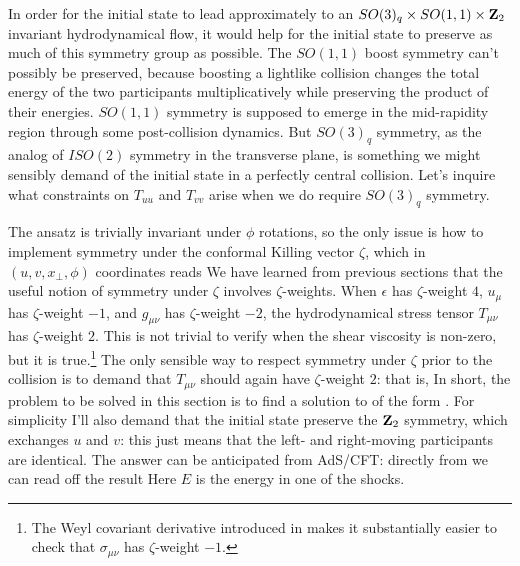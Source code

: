 \documentclass[12pt]{article}
\begin{document}
In order for the initial state  to lead approximately to an $SO(3)_q \times SO(1,1) \times {\bf Z}_2$ invariant hydrodynamical flow, it would help for the initial state to preserve as much of this symmetry group as possible.  The $SO(1,1)$ boost symmetry can't possibly be preserved, because boosting a lightlike collision changes the total energy of the two participants multiplicatively while preserving the product of their energies.  $SO(1,1)$ symmetry is supposed to emerge in the mid-rapidity region through some post-collision dynamics.  But $SO(3)_q$ symmetry, as the analog of $ISO(2)$ symmetry in the transverse plane, is something we might sensibly demand of the initial state in a perfectly central collision.  Let's inquire what constraints on $T_{uu}$ and $T_{vv}$ arise when we do require $SO(3)_q$ symmetry.

The ansatz  is trivially invariant under $\phi$ rotations, so the only issue is how to implement symmetry under the conformal Killing vector $\zeta$, which in $(u,v,x_\perp,\phi)$ coordinates reads
We have learned from previous sections that the useful notion of symmetry under $\zeta$ involves $\zeta$-weights.  When $\epsilon$ has $\zeta$-weight $4$, $u_\mu$ has $\zeta$-weight $-1$, and $g_{\mu\nu}$ has $\zeta$-weight $-2$, the hydrodynamical stress tensor $T_{\mu\nu}$ has $\zeta$-weight $2$.  This is not trivial to verify when the shear viscosity is non-zero, but it is true.\footnote{The Weyl covariant derivative introduced in \cite{Loganayagam:2008is} makes it substantially easier to check that $\sigma_{\mu\nu}$ has $\zeta$-weight $-1$.}  The only sensible way to respect symmetry under $\zeta$ prior to the collision is to demand that $T_{\mu\nu}$ should again have $\zeta$-weight $2$: that is,
In short, the problem to be solved in this section is to find a solution to  of the form .  For simplicity I'll also demand that the initial state preserve the ${\bf Z}_2$ symmetry, which exchanges $u$ and $v$: this just means that the left- and right-moving participants are identical.  The answer can be anticipated from AdS/CFT: directly from \cite{Gubser:2008pc} we can read off the result
Here $E$ is the energy in one of the shocks.
\end{document}
